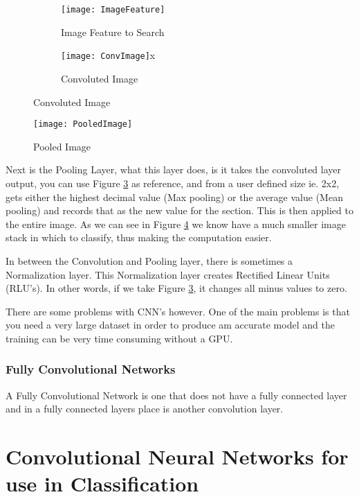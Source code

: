 \begin{figure}
    \caption{Image Convolution}  
    \begin{subfigure}[b]{0.4\textwidth}
          \texttt{[image: ImageFeature]}
          \caption{Image Feature to Search}
          \label{fig:feature}
      \end{subfigure}
      \begin{subfigure}[b]{0.4\textwidth}
           \texttt{[image: ConvImage]}x
           \caption{Convoluted Image}
           \label{fig:convoluted}
      \end{subfigure}
\end{figure}
\begin{figure}
    \texttt{[image: PooledImage]}
    \caption{Pooled Image}
    \label{fig:pooled}
\end{figure}
Next is the Pooling Layer, what this layer does, is it takes the convoluted
layer output, you can use Figure \ref{fig:convoluted} as reference, and from a
user defined size ie. 2x2, gets either the highest decimal value (Max pooling)
or the average value (Mean pooling) and records that as the new value for the
section. This is then applied to the entire image. As we can see in Figure
\ref{fig:pooled} we know have a much smaller image stack in which to classify,
thus making the computation easier.

In between the Convolution and Pooling layer, there is sometimes a Normalization
layer. This Normalization layer creates Rectified Linear Units (RLU's). In other
words, if we take Figure \ref{fig:convoluted}, it changes all minus values to
zero.

There are some problems with CNN's however. One of the main problems is that you
need a very large dataset in order to produce am accurate model and the training
can be very time consuming without a GPU.


\subsubsection*{Fully Convolutional Networks}
A Fully Convolutional Network is one that does not have a fully connected layer
and in a fully connected layers place is another convolution layer.

\section{Convolutional Neural Networks for use in Classification}


